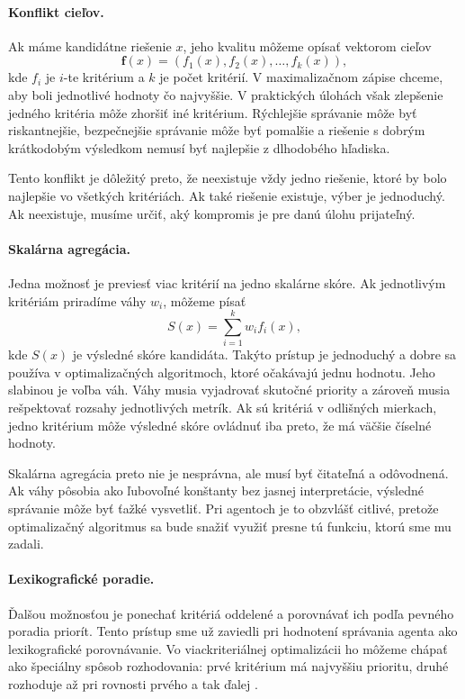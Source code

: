 \paragraph{Konflikt cieľov.}
Ak máme kandidátne riešenie $x$, jeho kvalitu môžeme opísať vektorom cieľov
\[
    \mathbf{f}(x) = (f_1(x), f_2(x), \ldots, f_k(x)),
\]
kde $f_i$ je $i$-te kritérium a $k$ je počet kritérií. V maximalizačnom zápise chceme, aby boli jednotlivé hodnoty čo najvyššie. V praktických úlohách však zlepšenie jedného kritéria môže zhoršiť iné kritérium. Rýchlejšie správanie môže byť riskantnejšie, bezpečnejšie správanie môže byť pomalšie a riešenie s dobrým krátkodobým výsledkom nemusí byť najlepšie z dlhodobého hľadiska.

Tento konflikt je dôležitý preto, že neexistuje vždy jedno riešenie, ktoré by bolo najlepšie vo všetkých kritériách. Ak také riešenie existuje, výber je jednoduchý. Ak neexistuje, musíme určiť, aký kompromis je pre danú úlohu prijateľný.

\paragraph{Skalárna agregácia.}
Jedna možnosť je previesť viac kritérií na jedno skalárne skóre. Ak jednotlivým kritériám priradíme váhy $w_i$, môžeme písať
\[
    S(x) = \sum_{i=1}^{k} w_i f_i(x),
\]
kde $S(x)$ je výsledné skóre kandidáta. Takýto prístup je jednoduchý a dobre sa používa v optimalizačných algoritmoch, ktoré očakávajú jednu hodnotu. Jeho slabinou je voľba váh. Váhy musia vyjadrovať skutočné priority a zároveň musia rešpektovať rozsahy jednotlivých metrík. Ak sú kritériá v odlišných mierkach, jedno kritérium môže výsledné skóre ovládnuť iba preto, že má väčšie číselné hodnoty.

Skalárna agregácia preto nie je nesprávna, ale musí byť čitateľná a odôvodnená. Ak váhy pôsobia ako ľubovoľné konštanty bez jasnej interpretácie, výsledné správanie môže byť ťažké vysvetliť. Pri agentoch je to obzvlášť citlivé, pretože optimalizačný algoritmus sa bude snažiť využiť presne tú funkciu, ktorú sme mu zadali.

\paragraph{Lexikografické poradie.}
Ďalšou možnosťou je ponechať kritériá oddelené a porovnávať ich podľa pevného poradia priorít. Tento prístup sme už zaviedli pri hodnotení správania agenta ako lexikografické porovnávanie. Vo viackriteriálnej optimalizácii ho môžeme chápať ako špeciálny spôsob rozhodovania: prvé kritérium má najvyššiu prioritu, druhé rozhoduje až pri rovnosti prvého a tak ďalej \cite{ehrgott2005multicriteria}.


